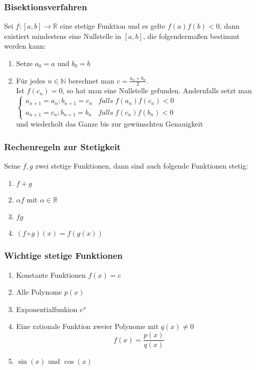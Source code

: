 \documentclass[a4paper,twocolumn,10pt]{article}
\begin{document}
\subsubsection{Bisektionsverfahren}
Sei $f:[a,b]\rightarrow\mathbb{R}$ eine stetige Funktion und es gelte $f(a)f(b)<0$, dann existiert mindestens eine Nullstelle in $[a,b]$, die folgendermaßen bestimmt werden kann:
\begin{enumerate}
\item Setze $a_0=a$ und $b_0=b$
\item Für jedes $n\in\mathbb{N}$ berechnet man $c=\frac{a_n+b_n}{2}$.\\
Ist $f(c_n)=0$, so hat man eine Nullstelle gefunden. Andernfalls setzt man\\
$\begin{cases}
a_{n+1}=a_n;b_{n+1}=c_n & falls\;f(a_n)f(c_n)<0 \\ a_{n+1}=c_n; b_{n+1}=b_n & falls\;f(c_n)f(b_n)<0
\end{cases}
$\\
und wiederholt das Ganze bis zur gewünschten Genauigkeit
\end{enumerate}

\subsubsection{Rechenregeln zur Stetigkeit}
Seine $f,g$ zwei stetige Funktionen, dann sind auch folgende Funktionen stetig:
\begin{enumerate}
\item $f+g$
\item $\alpha f$ mit $\alpha\in\mathbb{R}$
\item $fg$
\item $(f\circ g)(x)=f(g(x))$
\end{enumerate}

\subsubsection{Wichtige stetige Funktionen}
\begin{enumerate}
\item Konstante Funktionen $f(x)=c$
\item Alle Polynome $p(x)$
\item Exponentialfunkion $e^x$
\item Eine rationale Funktion zweier Polynome mit $q(x)\neq 0$
\begin{equation*}
f(x)=\frac{p(x)}{q(x)}
\end{equation*}
\item $\sin(x)$ und $\cos(x)$
\end{enumerate}
\end{document}
